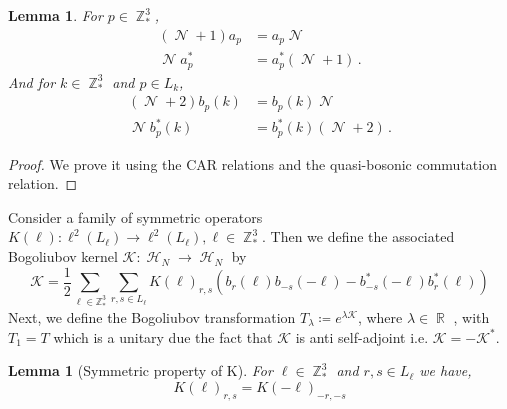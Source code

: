 \documentclass[sn-mathphys, Numbered ,a4paper]{sn-jnl}%
\DeclareMathOperator{\R}{\mathbb{R}}
\DeclareMathOperator{\Z}{\mathbb{Z}}
\DeclareMathOperator{\HH}{\mathcal{H}}
\DeclareMathOperator{\NN}{\mathcal{N}}
\newcommand{\half}{\frac{1}{2}}
\theoremstyle{plain}
\newtheorem{lemma}[theorem]{Lemma}
\theoremstyle{definition}
\theoremstyle{remark}
\theoremstyle{plain}
\theoremstyle{definition}
\theoremstyle{remark}
\begin{document}
\begin{lemma}\label{lem:commNab}
	For $p \in \Z^3_*$, 
	\begin{align}
		(\NN+1)a_p &= a_p\NN\\
		\NN a^*_p &= a^*_p (\NN+1)\,.
	\end{align}
	And for $k\in \Z^3_*$ and $p \in L_{k}$,
	\begin{align}
		(\NN+2)b_p(k) &= b_p(k)\NN\\
		\NN b^*_p(k) &= b^*_p(k) (\NN+2)\,.
	\end{align}
\end{lemma}
\begin{proof}
	We prove it using the CAR relations and the quasi-bosonic commutation relation.
\end{proof}
Consider a family of symmetric operators $K(\ell):\ell^2(L_\ell)\rightarrow \ell^2(L_\ell), \ell \in \Z^3_* $. Then we define the associated Bogoliubov kernel $\mathcal{K}:\HH_N\rightarrow\HH_N $ by
\begin{equation}
\mathcal{K} = \frac{1}{2}\sum\limits_{\ell\in \mathbb{Z}^3_*}\sum\limits_{r,s\in L_\ell}K(\ell)_{r,s}\left(b_r(\ell)b_{-s}(-\ell)-b^*_{-s}(-\ell)b^*_{r}(\ell)\right)
\end{equation}
Next, we define the Bogoliubov transformation $ T_\lambda\coloneq e^{\lambda\mathcal{K}}$, where $\lambda \in \R$ , with $T_1=T$ which is a unitary due the fact that $\mathcal{K}$ is anti self-adjoint i.e. $\mathcal{K}=-\mathcal{K}^* $.\newline
\begin{lemma}[Symmetric property of K]
    For $\ell \in \Z^3_*$ and $r,s \in L_{\ell}$ we have,
    \begin{equation}
        K(\ell)_{r,s} = K(-\ell)_{-r,-s}
    \end{equation}
\end{lemma}
\end{document}
